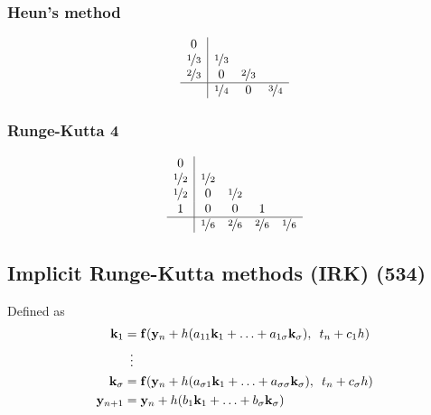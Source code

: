 \documentclass[a4paper, 12pt]{article}
\begin{document}
\subsubsection{Heun's method}
\begin{equation}
	\begin{array}{c|ccc}
		0         &           &           &           \\
		\nicefrac{1}{3} & \nicefrac{1}{3} &           &           \\
		\nicefrac{2}{3} & 0         & \nicefrac{2}{3} &           \\
		\hline
		          & \nicefrac{1}{4} & 0         & \nicefrac{3}{4} \\
	\end{array}
\end{equation}

\subsubsection{Runge-Kutta 4}
\begin{equation}
    \begin{array}{c|cccc}
		0     &           &           &           &           \\
		\nicefrac{1}{2} & \nicefrac{1}{2}     &           &           &           \\
		\nicefrac{1}{2} & 0         & \nicefrac{1}{2} &           &           \\
		1     & 0         & 0         & 1         &           \\ \hline
              & \nicefrac{1}{6} & \nicefrac{2}{6} & \nicefrac{2}{6} & \nicefrac{1}{6} \\
    \end{array}
\end{equation}

\subsection{Implicit Runge-Kutta methods (IRK) (534)}
Defined as
\begin{equation}
\begin{aligned}
\mathbf{k}_1      &= \mathbf{f}(\mathbf{y}_n + h(a_{11}\mathbf{k}_1 + \hdots + a_{1 \sigma}\mathbf{k}_\sigma), \enspace t_n + c_1 h) \\
             &  \enskip \vdots \\
\mathbf{k}_\sigma &= \mathbf{f}(\mathbf{y}_n + h(a_{\sigma 1}\mathbf{k}_1 + \hdots + a_{\sigma \sigma}\mathbf{k}_\sigma), \enspace t_n + c_\sigma h) \\
\mathbf{y}_{n+1}     &= \mathbf{y}_n + h (b_1\mathbf{k}_1 + \hdots + b_\sigma\mathbf{k}_\sigma)
\end{aligned}
\end{equation}
\end{document}

